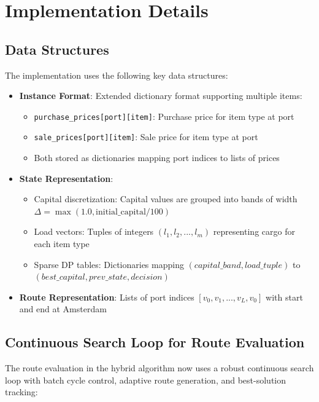 \documentclass[12pt]{article}
\begin{document}
\section{Implementation Details}
\label{sec:implementation}

\subsection{Data Structures}

The implementation uses the following key data structures:

\begin{itemize}
    \item \textbf{Instance Format}: Extended dictionary format supporting multiple items:
    \begin{itemize}
        \item \texttt{purchase\_prices[port][item]}: Purchase price for item type at port
        \item \texttt{sale\_prices[port][item]}: Sale price for item type at port
        \item Both stored as dictionaries mapping port indices to lists of prices
    \end{itemize}
    
    \item \textbf{State Representation}: 
    \begin{itemize}
        \item Capital discretization: Capital values are grouped into bands of width $\Delta = \max(1.0, \text{initial\_capital} / 100)$
        \item Load vectors: Tuples of integers $(l_1, l_2, ..., l_m)$ representing cargo for each item type
        \item Sparse DP tables: Dictionaries mapping $(capital\_band, load\_tuple)$ to $(best\_capital, prev\_state, decision)$
    \end{itemize}
    
    \item \textbf{Route Representation}: Lists of port indices $[v_0, v_1, ..., v_L, v_0]$ with start and end at Amsterdam
\end{itemize}

\subsection{Continuous Search Loop for Route Evaluation}

The route evaluation in the hybrid algorithm now uses a robust continuous search loop with batch cycle control, adaptive route generation, and best-solution tracking:
\end{document}
